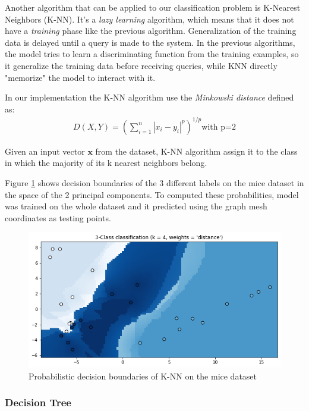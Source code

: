 \documentclass[10pt,conference,compsocconf]{IEEEtran}
\begin{document}
Another algorithm that can be applied to our classification problem is K-Nearest Neighbors (K-NN). It's a \emph{lazy learning} algorithm, which means that it does not have a \emph{training} phase like the previous algorithm. Generalization of the training data is delayed until a query is made to the system. In the previous algorithms, the model tries to learn a discriminating function from the training examples, so it generalize the training data before receiving queries, while KNN directly "memorize" the model to interact with it.

In our implementation the K-NN algorithm use the \emph{Minkowski distance} defined as:
\begin{align*}
    D\left(X,Y\right)=\left(\sum_{i=1}^n |x_i-y_i|^p\right)^{1/p} \text{with p=2}
\end{align*}

Given an input vector $\mathbf{x}$ from the dataset, K-NN algorithm assign it to the class in which the majority of its k nearest neighbors belong\cite{ml_python}.


Figure \ref{fig:knn} shows decision boundaries of the 3 different labels on the mice dataset in the space of the 2 principal components. To computed these probabilities, model was trained on the whole dataset and it predicted using the graph mesh coordinates as testing points.

\begin{figure}[H]
    \centering
    \includegraphics[width=\columnwidth]{figures/knn-4.png}
    \caption{Probabilistic decision boundaries of K-NN on the mice dataset}
    \label{fig:knn}
\end{figure}

\subsubsection{Decision Tree}
\end{document}
